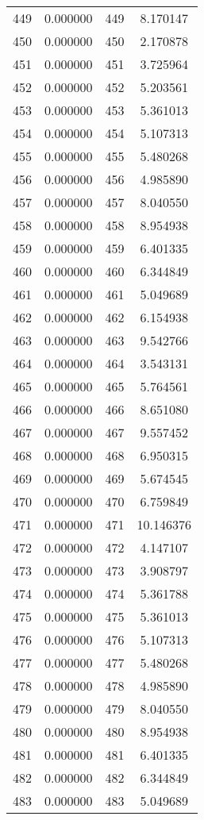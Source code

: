 \documentclass[12pt]{article}
\begin{document}
\begin{longtable}{@{}cccc@{}}
449 & 0.000000 & 449 & 8.170147 \\
450 & 0.000000 & 450 & 2.170878 \\
451 & 0.000000 & 451 & 3.725964 \\
452 & 0.000000 & 452 & 5.203561 \\
453 & 0.000000 & 453 & 5.361013 \\
454 & 0.000000 & 454 & 5.107313 \\
455 & 0.000000 & 455 & 5.480268 \\
456 & 0.000000 & 456 & 4.985890 \\
457 & 0.000000 & 457 & 8.040550 \\
458 & 0.000000 & 458 & 8.954938 \\
459 & 0.000000 & 459 & 6.401335 \\
460 & 0.000000 & 460 & 6.344849 \\
461 & 0.000000 & 461 & 5.049689 \\
462 & 0.000000 & 462 & 6.154938 \\
463 & 0.000000 & 463 & 9.542766 \\
464 & 0.000000 & 464 & 3.543131 \\
465 & 0.000000 & 465 & 5.764561 \\
466 & 0.000000 & 466 & 8.651080 \\
467 & 0.000000 & 467 & 9.557452 \\
468 & 0.000000 & 468 & 6.950315 \\
469 & 0.000000 & 469 & 5.674545 \\
470 & 0.000000 & 470 & 6.759849 \\
471 & 0.000000 & 471 & 10.146376 \\
472 & 0.000000 & 472 & 4.147107 \\
473 & 0.000000 & 473 & 3.908797 \\
474 & 0.000000 & 474 & 5.361788 \\
475 & 0.000000 & 475 & 5.361013 \\
476 & 0.000000 & 476 & 5.107313 \\
477 & 0.000000 & 477 & 5.480268 \\
478 & 0.000000 & 478 & 4.985890 \\
479 & 0.000000 & 479 & 8.040550 \\
480 & 0.000000 & 480 & 8.954938 \\
481 & 0.000000 & 481 & 6.401335 \\
482 & 0.000000 & 482 & 6.344849 \\
483 & 0.000000 & 483 & 5.049689 \\

\end{longtable}
\end{document}
